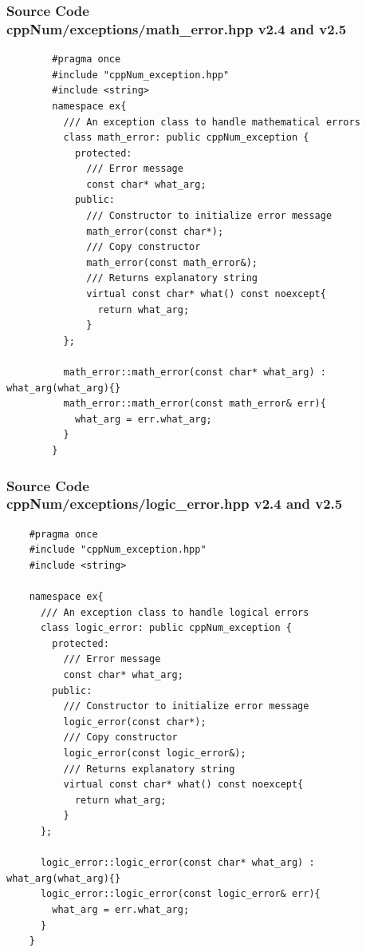 \documentclass[ucs,10pt]{beamer}
\begin{document}
\begin{frame}[fragile]
\frametitle{Source Code \\
        \small \color{rwth-blue} cppNum/exceptions/math\_error.hpp v2.4 and v2.5 }
	\begin{lstlisting}
        #pragma once
        #include "cppNum_exception.hpp"
        #include <string>
        namespace ex{
          /// An exception class to handle mathematical errors
          class math_error: public cppNum_exception {
            protected:
              /// Error message
              const char* what_arg;
            public:
              /// Constructor to initialize error message
              math_error(const char*);
              /// Copy constructor
              math_error(const math_error&);
              /// Returns explanatory string
              virtual const char* what() const noexcept{
                return what_arg;
              }
          };

          math_error::math_error(const char* what_arg) : what_arg(what_arg){}
          math_error::math_error(const math_error& err){
            what_arg = err.what_arg;
          }
        }
        \end{lstlisting}
\end{frame}

\begin{frame}[fragile]
\frametitle{Source Code \\
        \small \color{rwth-blue} cppNum/exceptions/logic\_error.hpp v2.4 and v2.5 }
	\begin{lstlisting}
	#pragma once
	#include "cppNum_exception.hpp"
	#include <string>
	
	namespace ex{
	  /// An exception class to handle logical errors
	  class logic_error: public cppNum_exception {
	    protected:
	      /// Error message
	      const char* what_arg;
	    public:
	      /// Constructor to initialize error message
	      logic_error(const char*);
	      /// Copy constructor
	      logic_error(const logic_error&);
	      /// Returns explanatory string
	      virtual const char* what() const noexcept{
	        return what_arg;
	      }
	  };
		
	  logic_error::logic_error(const char* what_arg) : what_arg(what_arg){}
	  logic_error::logic_error(const logic_error& err){
	    what_arg = err.what_arg;
	  }
	}
	\end{lstlisting}
\end{frame}
\end{document}

